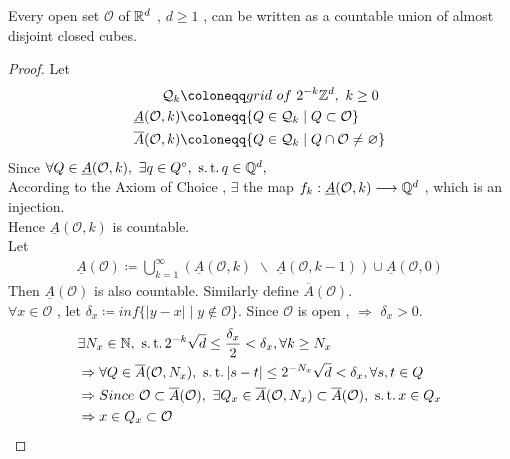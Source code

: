 	\begin{thm}\label{thm 1.1.4}
		Every open set $\mathcal{O}$ of $\mathbb{R}^d$ , $d \geq 1$ , can be written as a countable union of almost disjoint closed cubes.
		
		\vspace*{2em}
		\begin{proof}
			Let 
			\begin{align}
				\mathcal{Q}_k &\coloneqq grid \,\, of \,\, 2^{-k} \Z^d , \,\, k \geq 0 \\
				\underline{A}(\mathcal{O} , k) &\coloneqq \{ Q \in \mathcal{Q}_k \mid Q \subset \mathcal{O} \} \\
				\overline{A}(\mathcal{O} , k) &\coloneqq \{ Q \in \mathcal{Q}_k \mid Q \cap \mathcal{O} \neq \varnothing \}
			\end{align}
			Since $\forall Q \in \underline{A}(\mathcal{O} , k) , \,\, \exists q \in Q^{\circ} , \,\, \operatorname{s.t.} q \in \mathbb{Q}^d , $\\
			According to the Axiom of Choice , $\exists$ the map $f_k : \underline{A}(\mathcal{O} , k) \longrightarrow \mathbb{Q}^d$ , which is an injection.\\
			Hence $\underline{A}(\mathcal{O} , k)$ is countable.\\
			Let
			\begin{align}
				\underline{A}(\mathcal{O}) \coloneqq \bigcup_{k = 1}^{\infty}{\left( \underline{A}(\mathcal{O} , k) \,\, \backslash \,\, \underline{A}(\mathcal{O} , k - 1) \right)} \cup \underline{A}(\mathcal{O} , 0)
			\end{align}
			Then $\underline{A}(\mathcal{O})$ is also countable. Similarly define $\overline{A}(\mathcal{O})$.\\
			$\forall x \in \mathcal{O}$ , let $\delta_x \coloneqq inf \{ \left| y - x \right| \mid y \notin \mathcal{O} \}$. Since $\mathcal{O}$ is open , $\Rightarrow \,\, \delta_x > 0$.
			\begin{align}
				&\exists N_x \in \N , \,\, \st 2^{-k}\sqrt{d} \leq \frac{\delta_x}{2} < \delta_x , \forall k \geq N_x \\
				&\Rightarrow \forall Q \in \overline{A}(\mathcal{O} , N_x) , \,\, \st \left| s - t \right| \leq 2^{-N_x}\sqrt{d} < \delta_x , \forall s , t \in Q \\
				&\Rightarrow Since \,\, \mathcal{O} \subset \overline{A}(\mathcal{O}) , \,\, \exists Q_x \in \overline{A}(\mathcal{O} , N_x) \subset \overline{A}(\mathcal{O}) , \,\, \st x \in Q_x  \\
				&\Rightarrow x \in Q_x \subset \mathcal{O} \\

\end{align}
\end{proof}
\end{thm}
